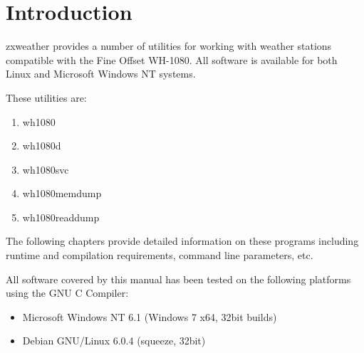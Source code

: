 \documentclass[a4paper,10pt,draft]{book}
\newcommand{\partnumber}{\ifthenelse{\isundefined{\projectnum}}{}{\projectnum-\docnum	\ifthenelse{\equal{\docrev}{001}}{}{.\docrev}}}
\begin{document}

\ifthenelse{\isundefined{\ordernumber}}{

\title{\doctitle{} - \docsubtitle}
\author{\docauthor}
}{

\title{\doctitle}
\subtitle{\docsubtitle}
\titleabstract{\docabstract}
\ordernumber{\partnumber}
\updateinfo{\docupdateinfo}
\osinfo{\docosver}
\swversion{\docswver}
\titlecopyright{\doccopyright}
\licensestatement{\doclicense}
}
\date{\docdate}

\maketitle

\clearpage

\tableofcontents
\clearpage


\chapter{Introduction}
\setcounter{page}{1}

zxweather provides a number of utilities for working with weather stations compatible with the Fine Offset WH-1080. All software is available for both Linux and Microsoft Windows NT systems.

These utilities are:
\begin{enumerate}
\item wh1080
\item wh1080d
\item wh1080svc
\item wh1080memdump
\item wh1080readdump
\end{enumerate}

The following chapters provide detailed information on these programs including runtime and compilation requirements, command line parameters, etc.

All software covered by this manual has been tested on the following platforms using the GNU C Compiler:
\begin{itemize}
\item Microsoft Windows NT 6.1 (Windows 7 x64, 32bit builds)
\item Debian GNU/Linux 6.0.4 (squeeze, 32bit)
\end{itemize}
\end{document}

